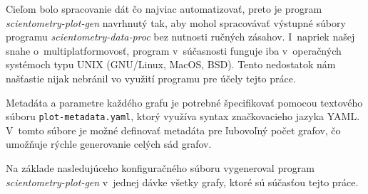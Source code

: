 Cieľom bolo spracovanie dát čo najviac automatizovať, preto je program
\emph{scientometry-plot-gen} navrhnutý tak, aby mohol spracovávať výstupné
súbory programu \emph{scientometry-data-proc} bez nutnosti ručných zásahov. 
I~napriek našej snahe o~multiplatformovosť, program v~súčasnosti funguje iba
v~operačných systémoch typu UNIX (GNU/Linux, MacOS, BSD). Tento nedostatok nám
našťastie nijak nebránil vo využití programu pre účely tejto práce.

Metadáta a parametre každého grafu je potrebné špecifikovať pomocou textového
súboru \verb|plot-metadata.yaml|, ktorý využíva syntax značkovacieho jazyka
YAML. V~tomto súbore je možné definovať metadáta pre ľubovoľný počet
grafov, čo umožňuje rýchle generovanie celých sád grafov.

Na základe nasledujúceho konfiguračného súboru vygeneroval
program \emph{scientometry-plot-gen} v~jednej dávke všetky grafy, ktoré sú
súčasťou tejto práce.

